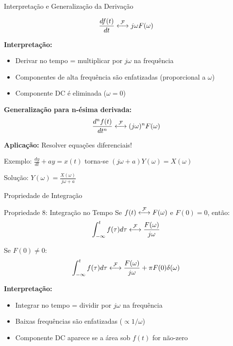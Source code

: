 
\begin{frame}{Interpretação e Generalização da Derivação}

\[
\frac{df(t)}{dt} \mathrel{\overset{\mathcal{F}}{\longleftrightarrow}} j\omega F(\omega)
\]

\textbf{Interpretação:}
\begin{itemize}
\item Derivar no tempo = multiplicar por $j\omega$ na frequência
\item Componentes de alta frequência são enfatizadas (proporcional a $\omega$)
\item Componente DC é eliminada ($\omega = 0$)
\end{itemize}

\textbf{Generalização para n-ésima derivada:}
\[
\frac{d^n f(t)}{dt^n} \mathrel{\overset{\mathcal{F}}{\longleftrightarrow}} (j\omega)^n F(\omega)
\]

\textbf{Aplicação:} Resolver equações diferenciais!

Exemplo: $\frac{dy}{dt} + ay = x(t)$ torna-se $(j\omega + a)Y(\omega) = X(\omega)$

Solução: $Y(\omega) = \frac{X(\omega)}{j\omega + a}$

\end{frame}


\begin{frame}{Propriedade de Integração}

\begin{block}{Propriedade 8: Integração no Tempo}
Se $f(t) \mathrel{\overset{\mathcal{F}}{\longleftrightarrow}} F(\omega)$ e $F(0) = 0$, então:
\vspace{-2mm}
\[
\int_{-\infty}^{t} f(\tau) d\tau \mathrel{\overset{\mathcal{F}}{\longleftrightarrow}} \frac{F(\omega)}{j\omega}
\]
\vspace{-5mm}

Se $F(0) \neq 0$:
\vspace{-2mm}
\[
\int_{-\infty}^{t} f(\tau) d\tau \mathrel{\overset{\mathcal{F}}{\longleftrightarrow}} \frac{F(\omega)}{j\omega} + \pi F(0) \delta(\omega)
\]
\vspace{-3mm}
\end{block}

\textbf{Interpretação:}
\begin{itemize}
\item Integrar no tempo = dividir por $j\omega$ na frequência
\item Baixas frequências são enfatizadas ($\propto 1/\omega$)
\item Componente DC aparece se a área sob $f(t)$ for não-zero
\end{itemize}

\end{frame}

